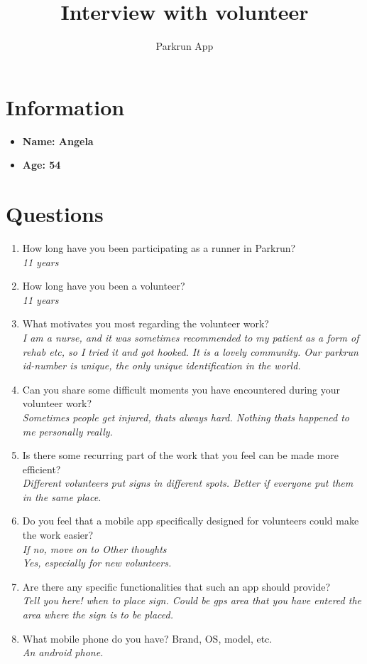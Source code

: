 \documentclass{article}
\title{\textbf{Interview with volunteer}}
\author{Parkrun App}
\date{}
\begin{document}
\maketitle
\thispagestyle{empty}
\section*{Information}
\begin{itemize}[label=]
    \item \textbf{Name: Angela} 
    \item \textbf{Age: 54} 
\end{itemize}

\section*{Questions}
\begin{enumerate}[label=\textbf{Question \arabic*:}]
    \item How long have you been participating as a runner in Parkrun?\\
        \textit{11 years}
    \item How long have you been a volunteer?\\
        \textit{11 years}
    \item What motivates you most regarding the volunteer work?\\
        \textit{I am a nurse, and it was sometimes recommended to my patient as a form of rehab etc, so I tried it and got hooked. It is a lovely community. Our parkrun id-number is unique, the only unique identification in the world. }
    \item Can you share some difficult moments you have encountered during your volunteer work?\\
        \textit{Sometimes people get injured, thats always hard. Nothing thats happened to me personally really. }
    \item Is there some recurring part of the work that you feel can be made more efficient?\\
        \textit{Different volunteers put signs in different spots. Better if everyone put them in the same place.}
    \item Do you feel that a mobile app specifically designed for volunteers could make the work easier?\\
    \textit{If no, move on to Other thoughts}\\
        \textit{Yes, especially for new volunteers.}
    \item Are there any specific functionalities that such an app should provide?\\
        \textit{Tell you here! when to place sign. Could be gps area that you have entered the area where the sign is to be placed.}
    \item What mobile phone do you have? Brand, OS, model, etc. \\
        \textit{An android phone.}
\end{enumerate}
\end{document}
